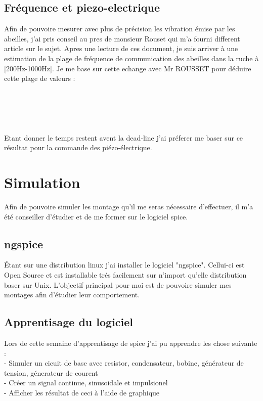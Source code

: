 \documentclass[11pt,french,a4paper]{article}
\begin{document}
\subsection{Fréquence et piezo-electrique}
Afin de pouvoire mesurer avec plus de précision les vibration émise par les abeilles, j'ai pris conseil au pres de monsieur Rouset qui m'a fourni different article sur le sujet.
Apres une lecture de ces document, je suis arriver à une estimation de la plage de fréquence de communication des abeilles dans la ruche à [200Hz-1000Hz]. Je me base sur cette echange avec Mr ROUSSET pour déduire cette plage de valeurs : \\ 
\\
\\
\\ \\ \\Etant donner le temps restent avent la dead-line j'ai préferer me baser sur ce résultat pour la commande des piézo-électrique.

\newpage
\section{Simulation}
Afin de pouvoire simuler les montage qu'il me seras nécessaire d'effectuer, il m'a été conseiller d'étudier et de me former sur le logiciel spice.

\subsection{ngspice}
Étant sur une distribution linux j'ai installer le logiciel "ngspice". Cellui-ci est Open Source et est installable trés facilement sur n'import qu'elle distribution baser sur Unix. L'objectif principal pour moi est de pouvoire simuler mes montages afin d'étudier leur comportement. 

\subsection{Apprentisage du logiciel}
Lors de cette semaine d'apprentisage de spice j'ai pu apprendre les chose suivante :
\\
- Simuler un cicuit de base avec resistor, condensateur, bobine, générateur de tension, génerateur de courent\\
- Créer un signal continue, sinusoidale et impulsionel \\
- Afficher les résultat de ceci à l'aide de graphique \\
\\
\end{document}
